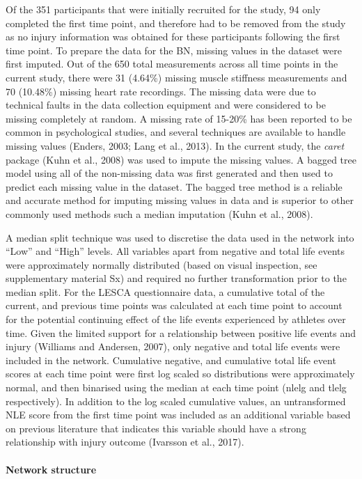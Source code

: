 \documentclass[
]{frontiersHLTH}
\begin{document}
Of the 351 participants that were initially recruited for the study, 94
only completed the first time point, and therefore had to be removed
from the study as no injury information was obtained for these
participants following the first time point. To prepare the data for the
BN, missing values in the dataset were first imputed. Out of the 650
total measurements across all time points in the current study, there
were 31 (4.64\%) missing muscle stiffness measurements and 70 (10.48\%)
missing heart rate recordings. The missing data were due to technical
faults in the data collection equipment and were considered to be
missing completely at random. A missing rate of 15-20\% has been
reported to be common in psychological studies, and several techniques
are available to handle missing values (Enders, 2003; Lang et al.,
2013). In the current study, the \emph{caret} package (Kuhn et al.,
2008) was used to impute the missing values. A bagged tree model using
all of the non-missing data was first generated and then used to predict
each missing value in the dataset. The bagged tree method is a reliable
and accurate method for imputing missing values in data and is superior
to other commonly used methods such a median imputation (Kuhn et al.,
2008).

A median split technique was used to discretise the data used in the
network into ``Low'' and ``High'' levels. All variables apart from
negative and total life events were approximately normally distributed
(based on visual inspection, see supplementary material Sx) and required
no further transformation prior to the median split. For the LESCA
questionnaire data, a cumulative total of the current, and previous time
points was calculated at each time point to account for the potential
continuing effect of the life events experienced by athletes over time.
Given the limited support for a relationship between positive life
events and injury (Williams and Andersen, 2007), only negative and total
life events were included in the network. Cumulative negative, and
cumulative total life event scores at each time point were first log
scaled so distributions were approximately normal, and then binarised
using the median at each time point (nlelg and tlelg respectively). In
addition to the log scaled cumulative values, an untransformed NLE score
from the first time point was included as an additional variable based
on previous literature that indicates this variable should have a strong
relationship with injury outcome (Ivarsson et al., 2017).

\hypertarget{network-structure}{%
\paragraph{Network structure}\label{network-structure}}
\end{document}
